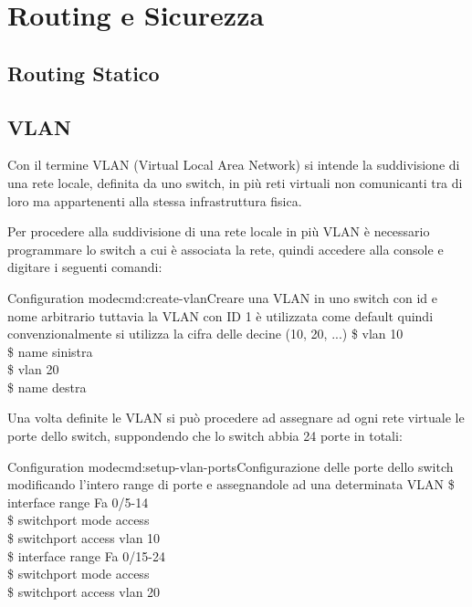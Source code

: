 \section{Routing e Sicurezza}
\subsection{Routing Statico}
\subsection{VLAN}
Con il termine VLAN (Virtual Local Area Network) si intende la suddivisione di una rete locale, definita da uno switch, in più reti virtuali non comunicanti tra di loro ma appartenenti alla stessa infrastruttura fisica.

Per procedere alla suddivisione di una rete locale in più VLAN è necessario programmare lo switch a cui è associata la rete, quindi accedere alla console e digitare i seguenti comandi:

\begin{cmds}[Switch]{Configuration mode}{cmd:create-vlan}{Creare una VLAN in uno switch con \textcolor{Highlight1}{id} e \textcolor{Highlight2}{nome} arbitrario tuttavia la VLAN con ID 1 è utilizzata come default quindi convenzionalmente si utilizza la cifra delle decine (10, 20, ...)}
    \$ vlan \textcolor{Highlight1}{10}\\
    \$ name \textcolor{Highlight2}{sinistra}\\
    \$ vlan \textcolor{Highlight1}{20}\\
    \$ name \textcolor{Highlight2}{destra}
\end{cmds}

Una volta definite le VLAN si può procedere ad assegnare ad ogni rete virtuale le porte dello switch, suppondendo che lo switch abbia 24 porte in totali:

\begin{cmds}{Configuration mode}{cmd:setup-vlan-ports}{Configurazione delle porte dello switch modificando l'intero \textcolor{Highlight1}{range} di porte e assegnandole ad una \textcolor{Highlight2}{determinata VLAN}}
    \$ interface range \textcolor{Highlight1}{Fa 0/5-14}\\
    \$ switchport mode access\\
    \$ switchport access \textcolor{Highlight2}{vlan 10}\\
    \$ interface range \textcolor{Highlight1}{Fa 0/15-24}\\
    \$ switchport mode access\\
    \$ switchport access \textcolor{Highlight2}{vlan 20}
\end{cmds}

